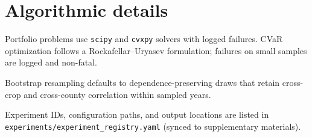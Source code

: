 \section{Algorithmic details}
\label{app:algorithms}

Portfolio problems use \texttt{scipy} and \texttt{cvxpy} solvers with logged failures.
CVaR optimization follows a Rockafellar--Uryasev formulation; failures on small samples are
logged and non-fatal.

Bootstrap resampling defaults to dependence-preserving draws that retain cross-crop and
cross-county correlation within sampled years.

Experiment IDs, configuration paths, and output locations are listed in
\texttt{experiments/experiment\_registry.yaml} (synced to supplementary materials).

